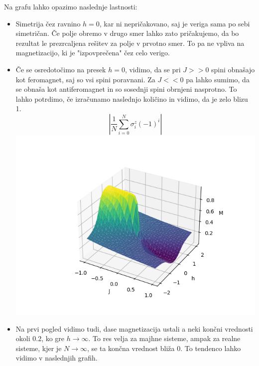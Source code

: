 \documentclass{article}
\begin{document}
\noindent Na grafu lahko opazimo naslednje lastnosti:
\begin{itemize}
    \item Simetrija čez ravnino $h = 0$, kar ni nepričakovano, saj je veriga sama po sebi simetričan. Če polje obremo v drugo smer lahko zato pričakujemo, da bo rezultat le prezrcaljena rešitev za polje v prvotno smer. To pa ne vpliva na magnetizacijo, ki je "izpovprečena" čez celo verigo.  

    \item Če se osredotočimo na presek $h = 0$, vidimo, da se pri $J >> 0$ spini obnašajo kot feromagnet, saj so vsi spini poravnani. Za $J << 0$ pa lahko sumimo, da se obnaša kot antiferomagnet in so sosednji spini obrnjeni nasprotno. To lahko potrdimo, če izračunamo naslednjo količino in vidimo, da je zelo blizu 1.
    \begin{equation}
    |\frac{1}{N}\sum_{i=0}^N \sigma_i^z (-1)^i|
    \end{equation}
    \includegraphics[]{STFIM_antiferomag.png}

    \item Na prvi pogled vidimo tudi, dase magnetizacija ustali a neki končni vrednosti okoli $0.2$, ko gre $h \rightarrow \infty$. To res velja za majhne sisteme, ampak za realne sisteme, kjer je $N \rightarrow \infty$, se ta končna vrednost bliža 0. To tendenco lahko vidimo v naslednjih grafih.


\end{itemize}
\end{document}
